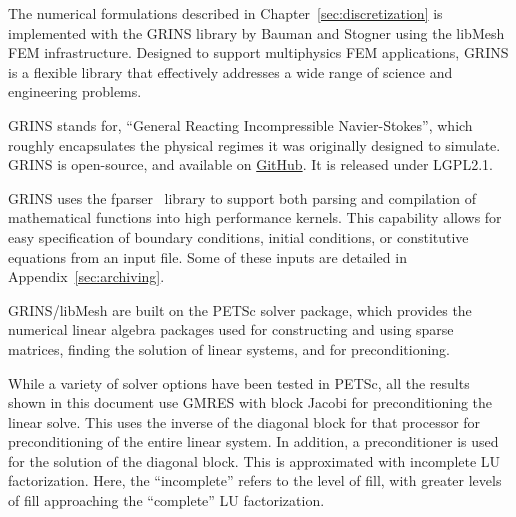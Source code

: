The numerical formulations described in Chapter~\ref{sec:discretization}
is implemented with the GRINS library\cite{GRINSpaper} by Bauman
and Stogner using the libMesh\cite{libMeshPaper} FEM
infrastructure. Designed to support multiphysics FEM applications, 
GRINS is a flexible library that effectively addresses a wide range of 
science and engineering problems.   
 


GRINS stands for, ``General Reacting Incompressible Navier-Stokes'',
which roughly encapsulates the physical regimes it was originally
designed to simulate. GRINS is open-source, and available on
\hyperref[www.github.com/grinsfem/grins]{GitHub}. It is released 
under LGPL2.1.  


GRINS uses the fparser~\cite{fparser}
library to support both parsing and compilation of mathematical
functions into high performance kernels. This capability allows for
easy specification of boundary conditions, initial conditions, or
constitutive equations from an input file. Some of these inputs are
detailed in Appendix~\ref{sec:archiving}. 

GRINS/libMesh are built on the PETSc\cite{petsc} solver package, which
provides the numerical linear algebra packages used for constructing and
using sparse matrices, finding the solution of linear systems,
and for preconditioning.  

While a variety of solver options have been tested in PETSc, all the
results shown in this document use GMRES with block Jacobi for
preconditioning\cite{Saad:2003} the linear solve. This uses the
inverse of the diagonal block for that processor for preconditioning of
the entire linear system. In addition, a preconditioner is used for the
solution of the diagonal block. This is approximated with incomplete LU
factorization\cite{chan1997approximate}. Here, the ``incomplete'' refers 
to the level of fill, with greater levels of fill approaching
the ``complete'' LU factorization. 

